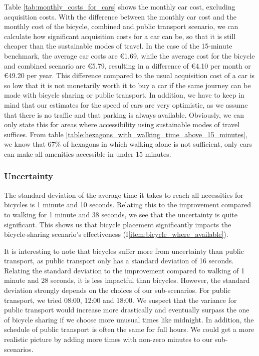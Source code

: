Table \ref{tab:monthly_costs_for_cars} shows the monthly car cost, excluding acquisition costs.
With the difference between the monthly car cost and the monthly cost of the bicycle, combined and public transport scenario, we can calculate how significant acquisition costs for a car can be, so that it is still cheaper than the sustainable modes of travel.
In the case of the 15-minute benchmark, the average car costs are \euro{1.69}, while the average cost for the bicycle and combined scenario are \euro{5.79}, resulting in a difference of \euro{4.10} per month or \euro{49.20} per year.
This difference compared to the usual acquisition cost of a car is so low that it is not monetarily worth it to buy a car if the same journey can be made with bicycle sharing or public transport.
In addition, we have to keep in mind that our estimates for the speed of cars are very optimistic, as we assume that there is no traffic and that parking is always available.
Obviously, we can only state this for areas where accessibility using sustainable modes of travel suffices.
From table \ref{table:hexagons_with_walking_time_above_15_minutes}, we know that 67\% of hexagons in which walking alone is not sufficient, only cars can make all amenities accessible in under 15 minutes.



\subsubsection{Uncertainty}

The standard deviation of the average time it takes to reach all necessities for bicycles is 1 minute and 10 seconds. 
Relating this to the improvement compared to walking for 1 minute and 38 seconds, we see that the uncertainty is quite significant.
This shows us that bicycle placement significantly impacts the bicycle-sharing scenario's effectiveness (I\ref{item:bicycle_where_available}).

It is interesting to note that bicycles suffer more from uncertainty than public transport, as public transport only has a standard deviation of 16 seconds.
Relating the standard deviation to the improvement compared to walking of 1 minute and 28 seconds, it is less impactful than bicycles.
However, the standard deviation strongly depends on the choices of our sub-scenarios. 
For public transport, we tried 08:00, 12:00 and 18:00.
We suspect that the variance for public transport would increase more drastically and eventually surpass the one of bicycle sharing if we choose more unusual times like midnight.
In addition, the schedule of public transport is often the same for full hours.
We could get a more realistic picture by adding more times with non-zero minutes to our sub-scenarios.

